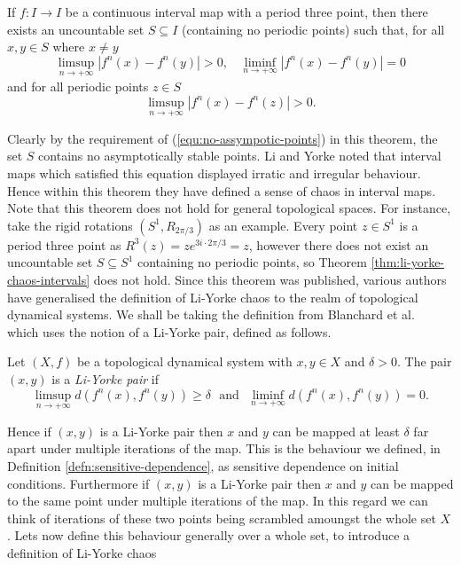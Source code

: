 \begin{thm} \label{thm:li-yorke-chaos-intervals}
    If $f: I \to I$ be a continuous interval map with a period three point, then there exists an uncountable set $S \subseteq I$ (containing no periodic points) such that, for all $x, y \in S$ where $x \neq y$
    \[\limsup_{n \to +\infty}\left\lvert f^n(x) - f^n(y) \right\rvert > 0, \ \ \ \ \liminf_{n \to +\infty}\left\lvert f^n(x) - f^n(y) \right\rvert = 0\] and for all periodic points $z \in S$ \begin{equation} \label{equ:no-assympotic-points}\limsup_{n \to +\infty}\left\lvert f^n(x) - f^n(z) \right\rvert > 0.\end{equation}
\end{thm}

Clearly by the requirement of (\ref{equ:no-assympotic-points}) in this theorem, the set $S$ contains no asymptotically stable points. Li and Yorke noted that interval maps which satisfied this equation displayed irratic and irregular behaviour. Hence within this theorem they have defined a sense of chaos in interval maps. Note that this theorem does not hold for general topological spaces. For instance, take the rigid rotations $(S^1, R_{2\pi/3})$ as an example. Every point $z \in S^1$ is a period three point as $R^3(z) = ze^{3i \cdot 2\pi/3} = z$, however there does not exist an uncountable set $S \subseteq S^1$ containing no periodic points, so Theorem \ref{thm:li-yorke-chaos-intervals} does not hold. Since this theorem was published, various authors have generalised the definition of Li-Yorke chaos to the realm of topological dynamical systems. We shall be taking the definition from Blanchard et al.\ \cite{bgsm} which uses the notion of a Li-Yorke pair, defined as follows.

\begin{defn} \label{defn:li-yorke-pair}
    Let $(X, f)$ be a topological dynamical system with $x, y \in X$ and $\delta > 0$. The pair $(x, y)$ is a \emph{Li-Yorke pair} if \[\limsup_{n \to +\infty} d\left( f^n(x), f^n(y) \right) \geq \delta \ \ \ \text{and} \ \ \ \liminf_{n\to+\infty} d\left( f^n(x), f^n(y) \right) = 0.\]
\end{defn}

Hence if $(x, y)$ is a Li-Yorke pair then $x$ and $y$ can be mapped at least $\delta$ far apart under multiple iterations of the map. This is the behaviour we defined, in Definition \ref{defn:sensitive-dependence}, as sensitive dependence on initial conditions. Furthermore if $(x, y)$ is a Li-Yorke pair then $x$ and $y$ can be mapped to the same point under multiple iterations of the map. In this regard we can think of iterations of these two points being scrambled amoungst the whole set $X$. Lets now define this behaviour generally over a whole set, to introduce a definition of Li-Yorke chaos

